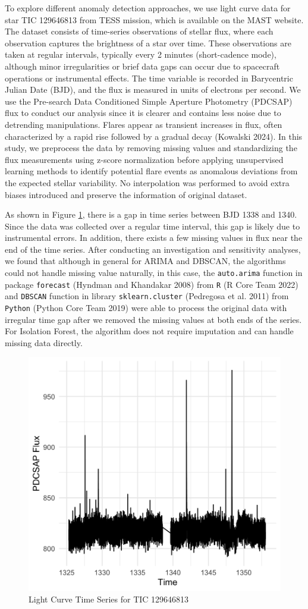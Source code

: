 \documentclass[
]{article}
\begin{document}
To explore different anomaly detection approaches, we use light curve data for star TIC 129646813 from TESS mission, which is available on the MAST website. The dataset consists of time-series observations of stellar flux, where each observation captures the brightness of a star over time. These observations are taken at regular intervals, typically every 2 minutes (short-cadence mode), although minor irregularities or brief data gaps can occur due to spacecraft operations or instrumental effects. The time variable is recorded in Barycentric Julian Date (BJD), and the flux is measured in units of electrons per second. We use the Pre-search Data Conditioned Simple Aperture Photometry (PDCSAP) flux to conduct our analysis since it is clearer and contains less noise due to detrending manipulations. Flares appear as transient increases in flux, often characterized by a rapid rise followed by a gradual decay (Kowalski 2024). In this study, we preprocess the data by removing missing values and standardizing the flux measurements using z-score normalization before applying unsupervised learning methods to identify potential flare events as anomalous deviations from the expected stellar variability. No interpolation was performed to avoid extra biases introduced and preserve the information of original dataset.

As shown in Figure \ref{fig:data}, there is a gap in time series between BJD 1338 and 1340. Since the data was collected over a regular time interval, this gap is likely due to instrumental errors. In addition, there exists a few missing values in flux near the end of the time series. After conducting an investigation and sensitivity analyses, we found that although in general for ARIMA and DBSCAN, the algorithms could not handle missing value naturally, in this case, the \texttt{auto.arima} function in package \texttt{forecast} (Hyndman and Khandakar 2008) from \texttt{R} (R Core Team 2022) and \texttt{DBSCAN} function in library \texttt{sklearn.cluster} (Pedregosa et al. 2011) from \texttt{Python} (Python Core Team 2019) were able to process the original data with irregular time gap after we removed the missing values at both ends of the series. For Isolation Forest, the algorithm does not require imputation and can handle missing data directly.

\begin{figure}[H]

{\centering \includegraphics[width=0.5\linewidth]{Figure/ts_plot_129} 

}

\caption{Light Curve Time Series for TIC 129646813}\label{fig:data}
\end{figure}
\end{document}
